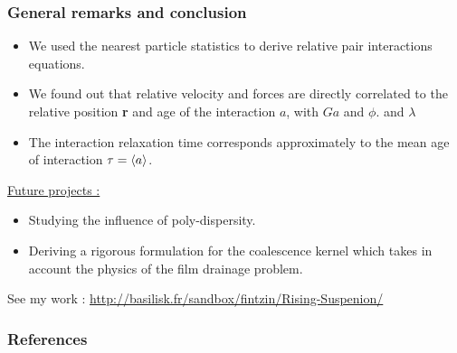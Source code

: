 \documentclass{sintefbeamer}
\begin{document}
\begin{frame}
  \frametitle{General remarks and conclusion}

  \begin{itemize}
    \item We used the nearest particle statistics to derive relative pair interactions equations. 
    \item We found out that relative velocity and forces are directly correlated to the relative position \textbf{r} and age of the interaction $a$, with $Ga$ and $\phi$. and $\lambda$ 
    \item The interaction relaxation time corresponds approximately to the mean age of interaction $\tau =\left<a\right>$. 
  \end{itemize}
    \underline{Future projects : }  
    \begin{itemize}
      \item Studying the influence of poly-dispersity. 
      \item Deriving a rigorous formulation for the coalescence kernel which takes in account the physics of the film drainage problem. 
    \end{itemize}
\vfill    
See my work : \url{http://basilisk.fr/sandbox/fintzin/Rising-Suspenion/}

\end{frame}

\begin{frame}[t]
  \frametitle{References}
  
\end{frame}


 
\backmatter


\section*{}
\end{document}
